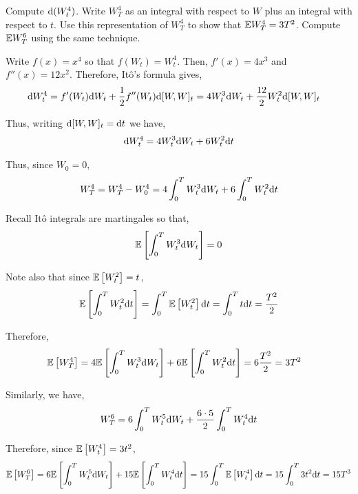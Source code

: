 \pagebreak
\begin{problem}[Exercise 8.1]
    Compute \( \mathrm{d}(W_t^4) \). Write \( W_T^4 \) as an integral with respect to \( W \) plus an integral with respect to \( t \). Use this representation of \( W_T^4 \) to show that \( \mathbb{E} W_T^4 = 3T^2 \). Compute \( \mathbb{E} W_T^6 \) using the same technique.
\end{problem}

\begin{solution}[Solution]
Write \( f(x) = x^4 \) so that \( f(W_t) = W_t^4 \). Then, \( f'(x) = 4x^3 \) and \( f''(x) = 12x^2 \). Therefore, It\^o's formula gives,
\begin{align*}
    \mathrm{d} W_t^4 &= f'(W_t)\mathrm{d} W_t + \frac{1}{2}f''(W_t) \mathrm{d}[W,W]_t 
    = 4W_t^3 \mathrm{d} W_t + \frac{12}{2} W_t^2 \mathrm{d}[W,W]_t 
\end{align*}

Thus, writing \( \mathrm{d}[W,W]_t = \mathrm{d} t \) we have,
\begin{align*}
    \mathrm{d} W_t^4 = 4W_t^3 \mathrm{d} W_t + 6W_t^2 \mathrm{d} t
\end{align*}
    
Thus, since \( W_0 = 0 \),
\begin{align*}
    W_T^4 = W_T^4 - W_0^4 = 4\int_{0}^{T} W_t^3\mathrm{d} W_t + 6 \int_{0}^{T}W_t^2 \mathrm{d} t
\end{align*}

Recall It\^o integrals are martingales so that,
\begin{align*}
    \mathbb{E} \left[ \int_{0}^{T}W_t^3\mathrm{d} W_t \right] = 0
\end{align*}

Note also that since \( \mathbb{E} \left[ W_t^2 \right] = t \),
\begin{align*}
    \mathbb{E} \left[ \int_{0}^{T}W_t^2 \mathrm{d} t \right] = \int_{0}^{T}\mathbb{E} \left[ W_t^2 \right]\mathrm{d} t = \int_{0}^{T} t \mathrm{d} t = \dfrac{T^2}{2}
\end{align*}

Therefore,
\begin{align*}
    \mathbb{E} \left[ W_T^4 \right] &= 4\mathbb{E} \left[ \int_{0}^{T}W_t^3 \mathrm{d} W_t \right] + 6 \mathbb{E} \left[ \int_{0}^{T}W_t^2 \mathrm{d} t \right] = 6\dfrac{T^2}{2} = 3 T^2
\end{align*}

Similarly, we have,
\begin{align*}
    W_T^6 = 6\int_{0}^{T} W_t^5 \mathrm{d} W_t + \dfrac{6\cdot 5}{2}\int_{0}^{T} W_t^4 \mathrm{d} t 
\end{align*}

Therefore, since \( \mathbb{E} \left[ W_t^4 \right] = 3t^2 \),
\begin{align*}
    \mathbb{E}\left[W_T^6\right] = 6 \mathbb{E}\left[\int_{0}^{T} W_t^5 \mathrm{d} W_t\right] + 15 \mathbb{E}\left[\int_{0}^{T} W_t^4 \mathrm{d} t \right] = 15 \int_{0}^{T} \mathbb{E} \left[ W_t^4 \right] \mathrm{d} t = 15 \int_{0}^{T} 3t^2 \mathrm{d} t = 15T^3 
\end{align*}
\end{solution}

